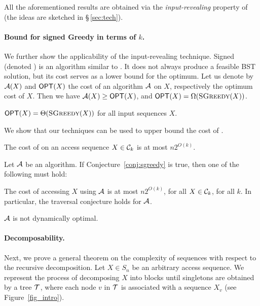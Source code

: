 All the aforementioned results are obtained via the {\em input-revealing} property of \greedy (the ideas are sketched in \S\,\ref{sec:tech}).
 

\paragraph{Bound for signed {\sc Greedy} in terms of $k$.} We further show the applicability of the input-revealing technique.  
Signed \greedy~\cite{DHIKP09} (denoted \sgreedy) is an algorithm similar to \greedy. It does not always produce a feasible BST solution, but its cost serves as a lower bound for the optimum. Let us denote by ${\mathcal{A}}(X)$ and $\mbox{\sf OPT}(X)$ the cost of an algorithm ${\mathcal{A}}$ on $X$, respectively the optimum cost of $X$. Then we have ${\mathcal{A}}(X) \geq \mbox{\sf OPT}(X)$, and $\mbox{\sf OPT}(X) = \Omega(\textsc{SGreedy}(X))$.

\begin{conjecture}
\label{conj:sgreedy}  
$\mbox{\sf OPT}(X) = \Theta(\textsc{SGreedy}(X))$ for all input sequences $X$. 
\end{conjecture} 
 
We show that our techniques can be used to upper bound the cost of \sgreedy.  

\begin{theorem}
\label{thm:sgreedy}
The cost of \sgreedy on an access sequence $X \in {\mathcal{C}}_k$ is at most $n 2^{O(k)}$. 

\end{theorem}

\begin{corollary} 
\label{cor:lower bound tight}
Let ${\mathcal{A}}$ be an algorithm. If Conjecture~\ref{conj:sgreedy} is true, then one of the following must hold:  
\begin{compactenum}[(i)]
\item The cost of accessing $X$ using ${\mathcal{A}}$ is at most $n 2^{O(k)}$, for all $X \in {\mathcal{C}}_k$, for all $k$. 
In particular, the traversal conjecture holds for ${\mathcal{A}}$.  
\item ${\mathcal{A}}$ is not dynamically optimal.  
\end{compactenum} 
\end{corollary} 

 
\paragraph{Decomposability.}
Next, we prove a general theorem on the complexity of sequences with respect to the recursive decomposition.
Let $X \in S_n$ be an arbitrary access sequence. We represent the process of decomposing $X$ into blocks until singletons are obtained by a tree ${\mathcal T}$, where each node $v$ in ${\mathcal T}$ is associated with a sequence $X_v$ (see Figure~\ref{fig_intro}).



